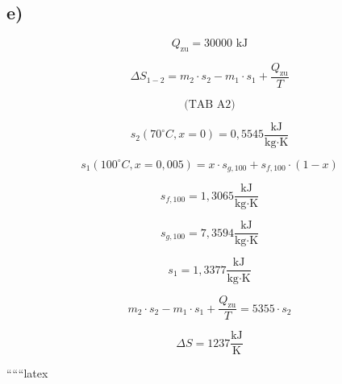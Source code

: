 

\subsection*{e)}

\[
Q_{\text{zu}} = 30000 \text{ kJ}
\]

\[
\Delta S_{1-2} = m_2 \cdot s_2 - m_1 \cdot s_1 + \frac{Q_{\text{zu}}}{T}
\]

\[
\text{(TAB A2)}
\]

\[
s_2 (70^\circ C, x = 0) = 0,5545 \frac{\text{kJ}}{\text{kg} \cdot \text{K}}
\]

\[
s_1 (100^\circ C, x = 0,005) = x \cdot s_{g,100} + s_{f,100} \cdot (1-x)
\]

\[
s_{f,100} = 1,3065 \frac{\text{kJ}}{\text{kg} \cdot \text{K}}
\]

\[
s_{g,100} = 7,3594 \frac{\text{kJ}}{\text{kg} \cdot \text{K}}
\]

\[
s_1 = 1,3377 \frac{\text{kJ}}{\text{kg} \cdot \text{K}}
\]

\[
m_2 \cdot s_2 - m_1 \cdot s_1 + \frac{Q_{\text{zu}}}{T} = 5355 \cdot s_2
\]

\[
\Delta S = 1237 \frac{\text{kJ}}{\text{K}}
\]

``````latex